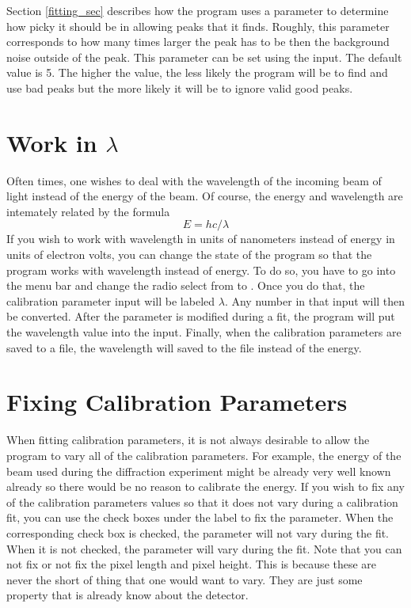 Section \ref{fitting_sec} describes how the program
uses a parameter to determine how picky it should
be in allowing peaks that it finds. Roughly, this
parameter corresponds to how many times larger
the peak has to be then the background noise outside
of the peak. This parameter can be set using the 
 input. The default value is 5. The higher 
the value, the less likely the program will be to find
and use bad peaks but the more likely it will be to
ignore valid good peaks.

\section{\texorpdfstring{Work in 
    $\lambda$}{Work in Lambda}}
    \label{workWavelength}

Often times, one wishes to deal with the wavelength 
of the incoming beam of light instead of the energy
of the beam. Of course, the energy and wavelength
are intemately related by the formula
\begin{equation}
    E=hc/\lambda
\end{equation}
If you wish to work with wavelength in units of
nanometers instead of energy in units of electron 
volts, you can change the state of the program so 
that the program works with wavelength instead
of energy. To do so, you have to go into the menu bar
and change the radio select from 
to . Once you do that, the 
calibration parameter input will be labeled
$\lambda$. Any number in that input will then be converted.
After the parameter is modified during a fit,
the program will put the wavelength value into
the input. Finally, when the calibration
parameters are saved to a file, the wavelength will
saved to the file instead of the energy.


\section{Fixing Calibration Parameters}
\label{fix_parameters}

When fitting calibration parameters, it is not
always desirable to allow the program to vary
all of the calibration parameters. For example,
the energy of the beam used during the diffraction
experiment might be already very well known already
so there would be no reason to calibrate the energy.
If you wish to fix any of the calibration parameters
values so that it does not vary during a calibration
fit, you can use the check boxes under the 
label to fix the parameter. When the corresponding
check box is checked, the parameter will not vary
during the fit. When it is not checked, the
parameter will vary during the fit. Note that you
can not fix or not fix the pixel length and 
pixel height. This is because these are never
the short of thing that one would want to vary.
They are just some property that is already know
about the detector. 

